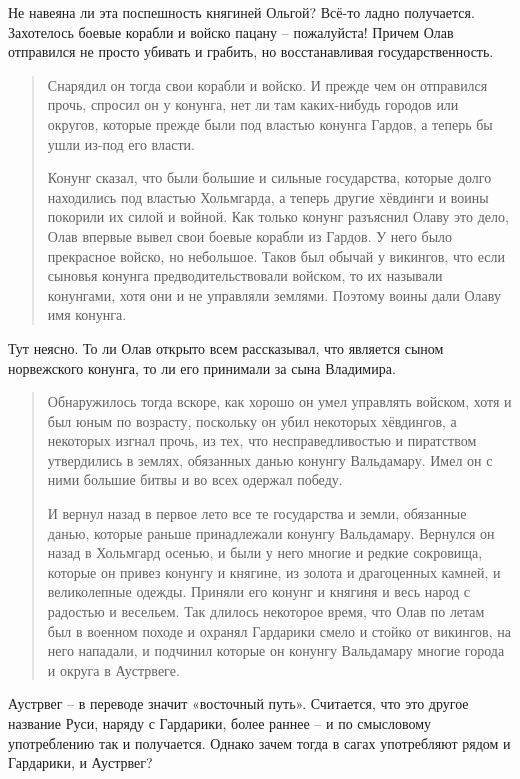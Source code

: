 Не навеяна ли эта поспешность княгиней Ольгой? Всё-то ладно получается. Захотелось боевые корабли и войско пацану – пожалуйста! Причем Олав отправился не просто убивать и грабить, но восстанавливая государственность.

\begin{quotation}
Снарядил он тогда свои корабли и войско. И прежде чем он отправился прочь, спросил он у конунга, нет ли там каких-нибудь городов или округов, которые прежде были под властью конунга Гардов, а теперь бы ушли из-под его власти. 

Конунг сказал, что были большие и сильные государства, которые долго находились под властью Хольмгарда, а теперь другие хёвдинги и воины покорили их силой и войной. Как только конунг разъяснил Олаву это дело, Олав впервые вывел свои боевые корабли из Гардов. У него было прекрасное войско, но небольшое. Таков был обычай у викингов, что если сыновья конунга предводительствовали войском, то их называли конунгами, хотя они и не управляли землями. Поэтому воины дали Олаву имя конунга.
\end{quotation}

Тут неясно. То ли Олав открыто всем рассказывал, что является сыном норвежского конунга, то ли его принимали за сына Владимира. 

\begin{quotation}
Обнаружилось тогда вскоре, как хорошо он умел управлять войском, хотя и был юным по возрасту, поскольку он убил некоторых хёвдингов, а некоторых изгнал прочь, из тех, что несправедливостью и пиратством утвердились в землях, обязанных данью конунгу Вальдамару. Имел он с ними большие битвы и во всех одержал победу.

И вернул назад в первое лето все те государства и земли, обязанные данью, которые раньше принадлежали конунгу Вальдамару. Вернулся он назад в Хольмгард осенью, и были у него многие и редкие сокровища, которые он привез конунгу и княгине, из золота и драгоценных камней, и великолепные одежды. Приняли его конунг и княгиня и весь народ с радостью и весельем. Так длилось некоторое время, что Олав по летам был в военном походе и охранял Гардарики смело и стойко от викингов, на него нападали, и подчинил которые он конунгу Вальдамару многие города и округа в Аустрвеге. 
\end{quotation}

Аустрвег – в переводе значит «восточный путь». Считается, что это другое название Руси, наряду с Гардарики, более раннее – и по смысловому употреблению так и получается. Однако зачем тогда в сагах употребляют рядом и Гардарики, и Аустрвег?

